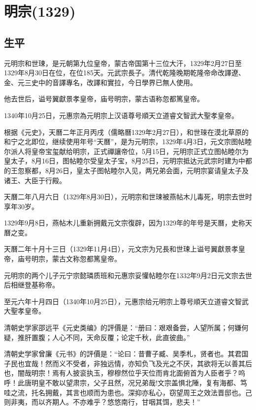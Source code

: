 
\section{明宗\tiny(1329)}

\subsection{生平}

元明宗和世㻋，是元朝第九位皇帝，蒙古帝国第十三位大汗，1329年2月27日至1329年8月30日在位，在位185天。元武宗長子。清代乾隆晚期乾隆帝命改譯遼、金、元三史中的音譯專名，改譯和實拉，今日學界已無人使用。

他去世后，谥号翼獻景孝皇帝，庙号明宗，蒙古语称忽都篤皇帝。

1340年10月25日，元惠宗為元明宗上汉语尊号順天立道睿文智武大聖孝皇帝。

根据《元史》，天曆二年正月丙戌（儒略曆1329年2月27日），和世琜在漠北草原的和宁之北即位，继续使用年号“天曆”，是为元明宗，1329年4月3日，元文宗图帖睦尔派人将皇帝宝玺献给明宗，正式禪讓帝位，5月15日，元明宗正式立图帖睦尔为皇太子，8月16日，图帖睦尔受皇太子宝，8月25日，元明宗抵达元武宗时建为中都的王忽察都，8月26日，皇太子图帖睦尔入见，两兄弟会面，元明宗宴请皇太子及诸王、大臣于行殿。

天曆二年八月六日（1329年8月30日），元明宗和世㻋被燕帖木儿毒死，明宗去世时享年30岁。

1329年9月8日，燕帖木儿重新拥戴元文宗復辟，因为1329年的年号是天曆，史称天曆之变。

天曆二年十月十三日（1329年11月4日），元文宗为兄長和世㻋上谥号翼獻景孝皇帝，庙号明宗，蒙古文称忽都篤皇帝。

元明宗的两个儿子元宁宗懿璘质班和元惠宗妥懽帖睦尔在1332年9月2日元文宗去世后相继登基称帝。

至元六年十月四日（1340年10月25日），元惠宗给元明宗上尊号順天立道睿文智武大聖孝皇帝。

清朝史学家邵远平《元史类编》的評價是：“册曰：艰艰备尝，人望所属；何嫌何疑，推肝置腹；人心不同，天命反覆；论定千秋，此直彼曲。”

清朝史学家曾廉《元书》的評價是：“论曰：昔曹子臧、吴季札，贤者也。其君国子民也宜哉！然而义不受者，非独远情，亦知负飞及光之不厌，其欲将无以善其后也，闇哉明宗！焉有人披衮执玉，穆穆然位乎天位而肯北面俯首为人臣者乎？呜呼！此唐明皇不敢以望肃宗，父子且然，况兄弟哉!文宗盖惧北陲，复有海都、笃哇之流，托名拥戴，其言也顺而为患也。深抑亦私心，窃望周王之效法晋邸也。己则非夷，而以齐期人。不亦难乎？悠悠南行，甘咽其饵，悲夫！”

